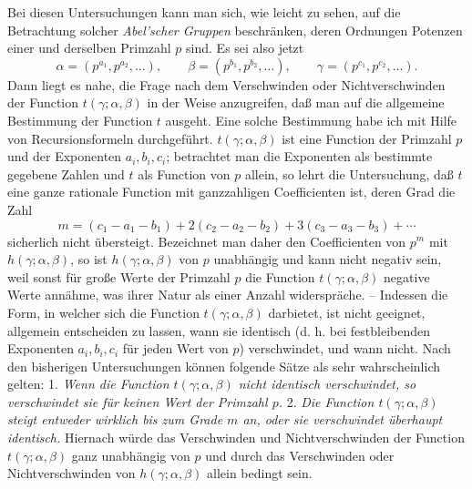 \documentclass[11pt,a4paper]{article}
\begin{document}
Bei diesen Untersuchungen kann man sich, wie leicht zu sehen, auf die Betrachtung solcher \emph{Abel'scher Gruppen} beschränken, deren Ordnungen Potenzen einer und derselben Primzahl $p$ sind. Es sei also jetzt
\[
 \alpha=(p^{a_1},p^{a_2},\ldots),\qquad
 \beta=(p^{b_1},p^{b_2},\ldots),\qquad
 \gamma=(p^{c_1},p^{c_2},\ldots).
\]
Dann liegt es nahe, die Frage nach dem Verschwinden oder Nichtverschwinden der Function $t(\gamma;\alpha,\beta)$ in der Weise anzugreifen, daß man auf die allgemeine Bestimmung der Function $t$ ausgeht. Eine solche Bestimmung habe ich mit Hilfe von Recursionsformeln durchgeführt. $t(\gamma;\alpha,\beta)$ ist eine Function der Primzahl $p$ und der Exponenten $a_i,b_i,c_i$; betrachtet man die Exponenten als bestimmte gegebene Zahlen und $t$ als Function von $p$ allein, so lehrt die Untersuchung, daß $t$ eine ganze rationale Function mit ganzzahligen Coefficienten ist, deren Grad die Zahl
\[
 m=(c_1-a_1-b_1)+2(c_2-a_2-b_2)+3(c_3-a_3-b_3)+\cdots
\]
sicherlich nicht übersteigt. Bezeichnet man daher den Coefficienten von $p^m$ mit $h(\gamma;\alpha,\beta)$, so ist $h(\gamma;\alpha,\beta)$ von $p$ unabhängig und kann nicht negativ sein, weil sonst für große Werte der Primzahl $p$ die Function $t(\gamma;\alpha,\beta)$ negative Werte annähme, was ihrer Natur als einer Anzahl widerspräche. -- Indessen die Form, in welcher sich die Function $t(\gamma;\alpha,\beta)$ darbietet, ist nicht geeignet, allgemein entscheiden zu lassen, wann sie identisch (d. h. bei festbleibenden Exponenten $a_i,b_i,c_i$ für jeden Wert von $p$) verschwindet, und wann nicht. Nach den bisherigen Untersuchungen können folgende Sätze als sehr wahrscheinlich gelten: 1. \emph{Wenn die Function $t(\gamma;\alpha,\beta)$ nicht identisch verschwindet, so verschwindet sie für keinen Wert der Primzahl $p$.} 2. \emph{Die Function $t(\gamma;\alpha,\beta)$ steigt entweder wirklich bis zum Grade $m$ an, oder sie verschwindet überhaupt identisch.} Hiernach würde das Verschwinden und Nichtverschwinden der Function $t(\gamma;\alpha,\beta)$ ganz unabhängig von $p$ und durch das Verschwinden oder Nichtverschwinden von $h(\gamma;\alpha,\beta)$ allein bedingt sein.
\end{document}
